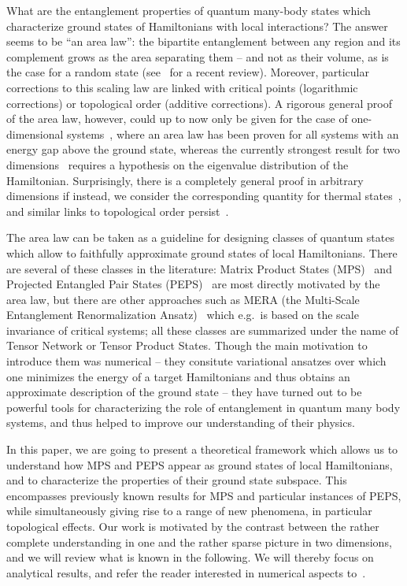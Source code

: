 \documentclass{article}
\theoremstyle{plain}
\theoremstyle{definition}
\numberwithin{equation}{section}  %
\begin{document}
What are the entanglement properties of quantum many-body
states which characterize ground states of Hamiltonians with local
interactions? The answer seems to be ``an area law'': the bipartite
entanglement between any region and its complement grows as the area
separating them -- and not as their volume, as is the case for a random
state (see~\cite{cramer:arealaw-review} for a recent review).
Moreover, particular corrections to this scaling law are linked with
critical points (logarithmic corrections) or topological order (additive
corrections).  A rigorous general proof of the area law, however, could up
to now only be given for the case of one-dimensional
systems~\cite{hastings:arealaw}, where an area law has been proven for all
systems with an energy gap above the ground state, whereas the currently
strongest result for two
dimensions~\cite{masanes:arealaw,hastings:mps-entropy-ent} requires a
hypothesis on the
eigenvalue distribution of the Hamiltonian. Surprisingly, there is a
completely general proof in arbitrary dimensions if instead, we consider
the corresponding quantity for thermal
states~\cite{wolf:mutual-info-arealaw}, and similar links to
topological order persist~\cite{iblisdir:topo-entropy-finite-T}.

The area law can be taken as a guideline for designing classes of quantum
states which allow to faithfully approximate ground states of local
Hamiltonians. There are several of these classes in the literature: Matrix
Product States (MPS)~\cite{ostlund-rommer} and Projected Entangled Pair
States (PEPS)~\cite{frank:2D-dmrg} are most directly motivated by the area
law, but there are other approaches such as MERA (the Multi-Scale
Entanglement Renormalization Ansatz)~\cite{vidal:mera} which e.g.\ is
based on the scale invariance of critical systems; all these classes are
summarized under the name of Tensor Network or Tensor Product States.
Though the main motivation to introduce them was numerical -- they
consitute variational ansatzes over which one minimizes the energy of a
target Hamiltonians and thus obtains an approximate description of the
ground state -- they have turned out to be powerful tools for
characterizing the role of entanglement in quantum many body systems, and
thus helped to improve our understanding of their physics.

In this paper, we are going to present a theoretical framework which
allows us to understand how MPS and PEPS appear as ground states of local
Hamiltonians, and to characterize the properties of their ground state
subspace.  This encompasses previously known results for MPS and
particular instances of PEPS, while simultaneously giving rise to a
range of new phenomena, in particular topological effects.  Our work is
motivated by the contrast between the rather complete understanding in one
and the rather sparse picture in two dimensions, and we will review
what is known in the following. We will thereby focus on analytical
results, and refer the reader interested in numerical aspects
to~\cite{murg:peps-review}.
\end{document}
